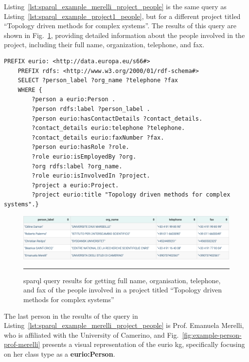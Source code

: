 Listing~\ref{lst:sparql_example_merelli_project_people} is the same query as Listing~\ref{lst:sparql_example_project1_people}, but for a different project titled ``Topology driven methods for complex systems''.
The results of this query are shown in Fig.~\ref{fig:sparql_example_merelli_project_people}, providing detailed information about the people involved in the project, including their full name, organization, telephone, and fax.

\begin{lstlisting}[language=SPARQL, caption={\gls{sparql} query for getting full name, organisation, telephone, and fax of the people involved in a project titled ``Topology driven methods for complex systems''}, label=lst:sparql_example_merelli_project_people]
    PREFIX eurio: <http://data.europa.eu/s66#>
    PREFIX rdfs: <http://www.w3.org/2000/01/rdf-schema#>
    SELECT ?person_label ?org_name ?telephone ?fax
    WHERE {
        ?person a eurio:Person .
        ?person rdfs:label ?person_label .
        ?person eurio:hasContactDetails ?contact_details.
        ?contact_details eurio:telephone ?telephone.
        ?contact_details eurio:faxNumber ?fax.
        ?person eurio:hasRole ?role.
        ?role eurio:isEmployedBy ?org.
        ?org rdfs:label ?org_name.
        ?role eurio:isInvolvedIn ?project.
        ?project a eurio:Project.
        ?project eurio:title "Topology driven methods for complex systems".}
\end{lstlisting}

\begin{figure}[htbp]
    \centering
 \includegraphics[width=.9\textwidth]{figures/architecture/sparql_example_merelli_project_people.png}
     \rule{35em}{0.5pt}
    \caption{\gls{sparql} query results for getting full name, organisation, telephone, and fax of the people involved in a project titled ``Topology driven methods for complex systems''}
 \label{fig:sparql_example_merelli_project_people}
\end{figure}

The last person in the results of the query in Listing~\ref{lst:sparql_example_merelli_project_people} is Prof. Emanuela Merelli, who is affiliated with the University of Camerino, and Fig.~\ref{fig:example-person-prof-merelli} presents a visual representation of the \gls{eurio} \gls{kg}, specifically focusing on her class type as a \textbf{eurio:Person}.

